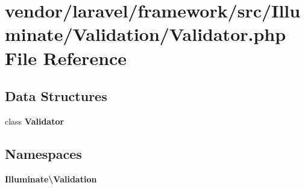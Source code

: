\section{vendor/laravel/framework/src/\+Illuminate/\+Validation/\+Validator.php File Reference}
\label{_validation_2_validator_8php}
\subsection*{Data Structures}
\begin{DoxyCompactItemize}
\item 
class {\bf Validator}
\end{DoxyCompactItemize}
\subsection*{Namespaces}
\begin{DoxyCompactItemize}
\item 
 {\bf Illuminate\textbackslash{}\+Validation}
\end{DoxyCompactItemize}
